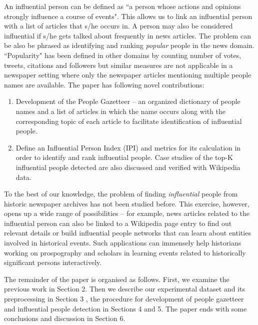 \documentclass[10pt,journal,compsoc]{IEEEtran}
\begin{document}
 An influential person can be defined as ``a person whose actions and opinions strongly influence a course of events". This allows us to link an influential person with a list of articles that s/he occurs in.
 A person may also be considered influential if s/he gets talked about frequently in news articles. The problem can be also be phrased as identifying and ranking \emph{popular} people in the news domain. 
 ``Popularity" has been defined in other domains by counting number of votes, tweets, citations and followers \cite{cheng2014can} but similar measures are not applicable in a newspaper setting where only the newspaper articles mentioning multiple people names are available.  
 The paper has following novel contributions:
\begin{enumerate}
\item Development of the People Gazetteer -- an organized dictionary of people names and a list of articles in which the name occurs along with the corresponding topic of each article to facilitate identification of influential people.
\item Define an Influential Person Index (IPI) and metrics for its calculation in order to identify and rank influential people. Case studies of the top-K influential people detected are also discussed and verified with Wikipedia data. 
\end{enumerate}

To the best of our knowledge, the problem of finding \emph{influential} people from historic newspaper archives has not been studied before. This exercise, however, opens up a wide range of possibilities -- for example, news articles related to the influential person can also be linked to a Wikipedia page entry to find out relevant details or build influential people networks that can learn about entities involved in historical events. Such applications can immensely help historians working on prospography\cite{allen2013toward} and scholars in learning events related to historically significant persons interactively.

The remainder of the paper is organised as follows.
First, we examine the previous work in Section 2. Then we describe our experimental dataset and its preprocessing in Section 3 , the procedure for development of people gazetteer and influential people detection in Sections 4 and 5.  The
paper ends with some conclusions and discussion in Section 6.

\end{document}
